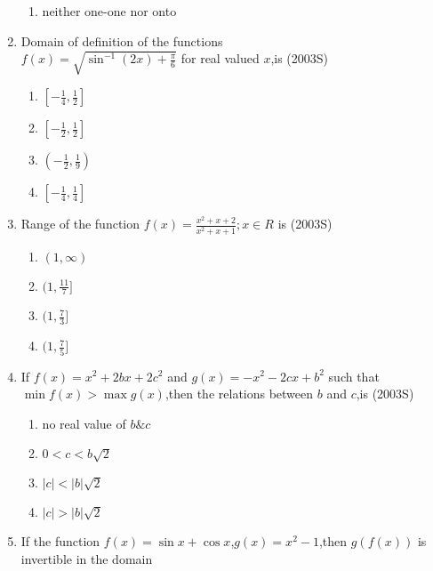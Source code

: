 \documentclass[journal,12pt,twocolumn]{IEEEtran}
\theoremstyle{remark}
\begin{document}
\begin{enumerate}
\begin{enumerate}
    \item neither one-one nor onto
\end{enumerate}
\item Domain of definition of the functions\\ $f(x)=\sqrt{\sin^{-1}(2x)+\frac{\pi}{6}}$ for real valued $x$,is
\hfill(2003S)\\
\begin{multicols}{2}
\begin{enumerate}
    \item$\left[-\frac{1}{4},\frac{1}{2}\right]$\\
    \item$\left[-\frac{1}{2},\frac{1}{2}\right]$\\
    \item$\left(-\frac{1}{2},\frac{1}{9}\right)$\\
    \item$\left[-\frac{1}{4},\frac{1}{4}\right]$
\end{enumerate}
\end{multicols}
\item Range of the function $f(x)=\frac{x^2+x+2}{x^2+x+1};x\in R$ is
\hfill(2003S)\\
\begin{multicols}{2}
\begin{enumerate}
    \item $(1,\infty)$
    \item $(1,\frac{11}{7}]$
    \item $(1,\frac{7}{3}]$
    \item $(1,\frac{7}{5}]$
\end{enumerate}
\end{multicols}
\item If $f(x)=x^2+2bx+2c^2$ and $g(x)=-x^2-2cx+b^2$ such that $\min f(x)> \max g(x)$,then the relations between $b$ and $c$,is
\hfill(2003S)\\
\begin{multicols}{2}
\begin{enumerate}
    \item no real value of $b\& c$
    \item $0<c<b\sqrt{2}$
    \item $|c|<|b|\sqrt{2}$
    \item $|c|>|b|\sqrt{2}$
\end{enumerate}
\end{multicols}
\item If the function $f(x)=\sin x+\cos x$,$g(x)=x^2-1$,then $g(f(x))$ is invertible in the domain 

\end{enumerate}
\end{document}
